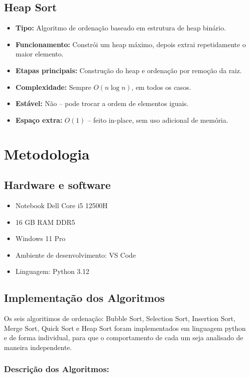 \documentclass[12pt, a4paper]{report}
\begin{document}
\section{Heap Sort}
\begin{itemize}
  \item \textbf{Tipo:} Algoritmo de ordenação baseado em estrutura de heap binário.
  \item \textbf{Funcionamento:} Constrói um heap máximo, depois extrai repetidamente o maior elemento.
  \item \textbf{Etapas principais:} Construção do heap e ordenação por remoção da raiz.
  \item \textbf{Complexidade:} Sempre $O(n \log n)$, em todos os casos.
  \item \textbf{Estável:} Não – pode trocar a ordem de elementos iguais.
  \item \textbf{Espaço extra:} $O(1)$ – feito in-place, sem uso adicional de memória.
\end{itemize}


\chapter{Metodologia}
\section{Hardware e software}
\begin{itemize}
    \item Notebook Dell Core i5 12500H
    \item 16 GB RAM DDR5
    \item Windows 11 Pro
    \item Ambiente de desenvolvimento: VS Code
    \item Linguagem: Python 3.12
\end{itemize}

\section{Implementação dos Algoritmos}
Os seis algoritimos de ordenação: Bubble Sort,
Selection Sort, Insertion Sort, Merge Sort, Quick Sort e Heap Sort foram implementados em linguagem python e de forma individual, para que o comportamento de cada um seja analisado de maneira independente.
\subsection*{Descrição dos Algoritmos:}
\end{document}
